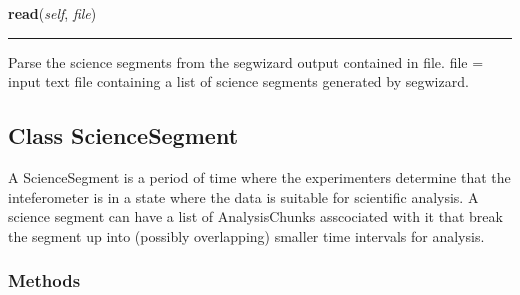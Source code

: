     \label{pipeline:ScienceData:read}
    \vspace{0.5ex}

    \noindent\begin{boxedminipage}{\textwidth}

    \raggedright \textbf{read}(\textit{self}, \textit{file})

    \vspace{-1.5ex}

    \rule{\textwidth}{0.5\fboxrule}
    Parse the science segments from the segwizard output contained in 
    file. file = input text file containing a list of science segments 
    generated by segwizard.

    \vspace{1ex}

    \end{boxedminipage}



\subsection{Class ScienceSegment}

    \label{pipeline:ScienceSegment}
A ScienceSegment is a period of time where the experimenters determine 
that the inteferometer is in a state where the data is suitable for 
scientific analysis. A science segment can have a list of AnalysisChunks 
asscociated with it that break the segment up into (possibly overlapping) 
smaller time intervals for analysis.



  \subsubsection{Methods}

